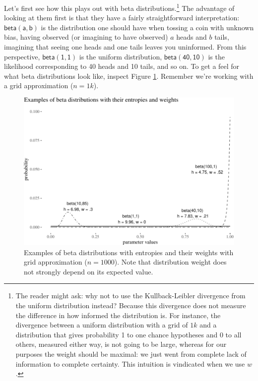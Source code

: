 \documentclass[
  10pt,
  dvipsnames,enabledeprecatedfontcommands]{scrartcl}
\begin{document}
Let's first see how this plays out with beta distributions.\footnote{The
  reader might ask: why not to use the Kullback-Leibler divergence from
  the uniform distribution instead? Because this divergence does not
  measure the difference in how informed the distribution is. For
  instance, the divergence between a uniform distribution with a grid of
  \(1k\) and a distribution that gives probability 1 to one chance
  hypotheses and 0 to all others, measured either way, is not going to
  be large, whereas for our purposes the weight should be maximal: we
  just went from complete lack of information to complete certainty.
  This intuition is vindicated when we use \(w\).} The advantage of
looking at them first is that they have a fairly straightforward
interpretation: \(\mathsf{beta(a,b)}\) is the distribution one should
have when tossing a coin with unknown bias, having observed (or
imagining to have observed) \(a\) heads and \(b\) tails, imagining that
seeing one heads and one tails leaves you uninformed. From this
perspective, \(\mathsf{beta(1,1)}\) is the uniform distribution,
\(\mathsf{beta(40,10)}\) is the likelihood corresponding to 40 heads and
10 tails, and so on. To get a feel for what beta distributions look
like, inspect Figure \ref{fig:betas}. Remember we're working with a grid
approximation (\(n=1k\)).

\begin{figure}[H]


\begin{center}\includegraphics[width=1\linewidth]{imprecision_weight_files/figure-latex/fig:betas3-1} \end{center}
\caption{Examples of beta distributions with entropies and their weights with grid approximation ($n=1000$). Note that distribution weight does not strongly depend on its expected value.}
\label{fig:betas}
\end{figure}
\end{document}
